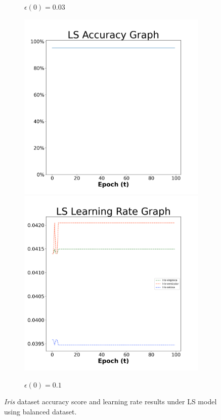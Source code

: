 \begin{figure}[H]
\begin{subfigure}{0.3\textwidth}
  \caption{$\epsilon(0)=0.03$}
\end{subfigure}\hfil %
\begin{subfigure}{0.3\textwidth}
  \includegraphics[width=\linewidth]{images/exper1/iris/LS_0.1_acc.png}
  \includegraphics[width=\linewidth]{images/exper1/iris/LS_0.1_lr.png}
  \caption{$\epsilon(0)=0.1$}
\end{subfigure}

\caption{\textit{Iris} dataset accuracy score and learning rate results under LS model using balanced dataset.}
\end{figure}


